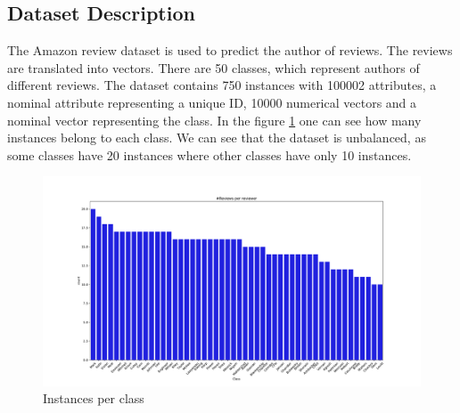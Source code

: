 \documentclass[11pt]{article}
\begin{document}
\subsection{Dataset Description} 
The Amazon review dataset is used to predict the author of reviews. The reviews are translated into vectors. There are 50 classes, which represent authors of different reviews. The dataset contains 750 instances with 100002 attributes, a nominal attribute representing a unique ID, 10000 numerical vectors and a nominal vector representing the class.
\newline 
In the figure \ref{Fig::Instances_per_class} one can see how many instances belong to each class. We can see that the dataset is unbalanced, as some classes have 20 instances where other classes have only 10 instances.
%
\begin{figure}[h]
\begin{minipage}[t]{1.0\textwidth}
\includegraphics[width=1.0\linewidth]{amazon/Instances_per_class.pdf}
\end{minipage}
\caption{Instances per class}
\label{Fig::Instances_per_class}
\end{figure}
%
\end{document}
